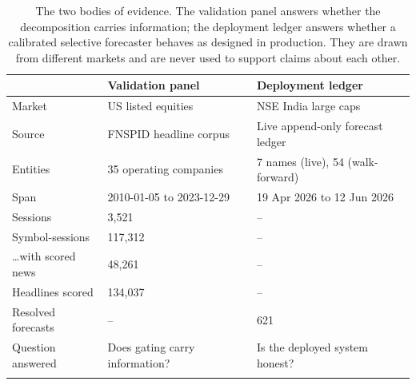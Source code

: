 \begin{table}[htbp]
\caption{The two bodies of evidence. The validation panel answers whether the
decomposition carries information; the deployment ledger answers whether a
calibrated selective forecaster behaves as designed in production. They are drawn
from different markets and are never used to support claims about each other.}
\label{tab:data}
\begin{tabular}{@{}lll@{}}
\toprule
 & \textbf{Validation panel} & \textbf{Deployment ledger} \\
\midrule
Market & US listed equities & NSE India large caps \\
Source & FNSPID headline corpus & Live append-only forecast ledger \\
Entities & 35 operating companies & 7 names (live), 54 (walk-forward) \\
Span & 2010-01-05 to 2023-12-29 & 19 Apr 2026 to 12 Jun 2026 \\
Sessions & 3,521 & -- \\
Symbol-sessions & 117,312 & -- \\
\ldots with scored news & 48,261 & -- \\
Headlines scored & 134,037 & -- \\
Resolved forecasts & -- & 621 \\
Question answered & Does gating carry information? & Is the deployed system honest? \\
\botrule
\end{tabular}
\end{table}

